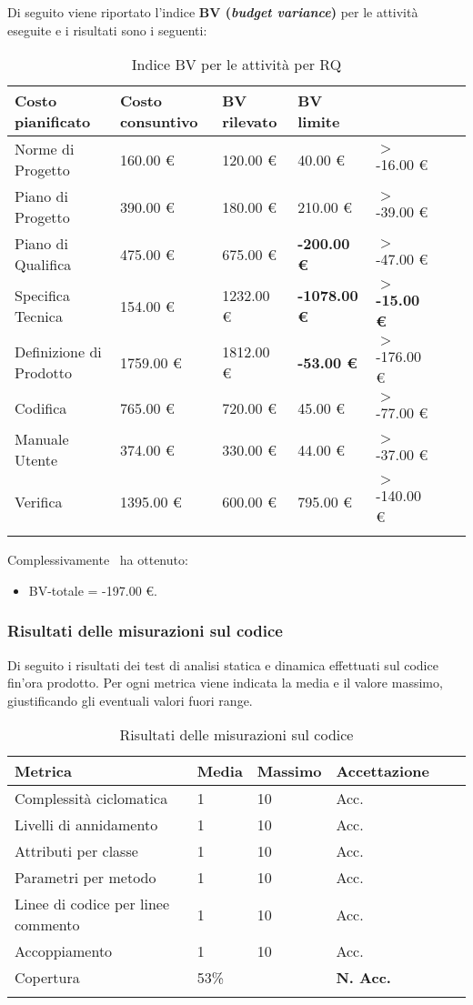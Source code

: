 Di seguito viene riportato l'indice \textbf{BV (\textit{budget variance})} per le attività eseguite e i risultati sono i seguenti:
\begin{longtable}{lllllXr}
\toprule
\textbf{Costo pianificato} & \textbf{Costo consuntivo} & \textbf{BV rilevato} & \textbf{BV limite} \\
\toprule
Norme di Progetto & 160.00 € & 120.00 € & 40.00 € & $>$ -16.00 €\\
\midrule
Piano di Progetto & 390.00 € & 180.00 € & 210.00 € & $>$ -39.00 €\\
\midrule
Piano di Qualifica & 475.00 € & 675.00 € & \textbf{-200.00 €} & $>$ -47.00 €\\
\midrule
Specifica Tecnica & 154.00 € & 1232.00 € & \textbf{-1078.00 €} & \textbf{$>$ -15.00 €}\\
\midrule
Definizione di Prodotto & 1759.00 € & 1812.00 € & \textbf{-53.00 €} & $>$ -176.00 €\\
\midrule
Codifica & 765.00 € & 720.00 € & 45.00 € & $>$ -77.00 €\\
\midrule
Manuale Utente & 374.00 € & 330.00 € & 44.00 € & $>$ -37.00 €\\
\midrule
Verifica & 1395.00 € & 600.00 € & 795.00 € & $>$ -140.00 €\\
\bottomrule
\caption{Indice BV per le attività per RQ}
\end{longtable}
Complessivamente \gruppo ~ha ottenuto:
\begin{itemize}
\item BV-totale = -197.00 €.
\end{itemize}
\subsubsection{Risultati delle misurazioni sul codice}
Di seguito i risultati dei test di analisi statica e dinamica effettuati sul codice fin'ora prodotto. Per ogni metrica viene indicata la media e il valore massimo, giustificando gli eventuali valori fuori range.\\
\begin{longtable}{llllXr}
\toprule
\textbf{Metrica} & \textbf{Media} & \textbf{Massimo} & \textbf{Accettazione}\\
\toprule
Complessità ciclomatica & 1 & 10 & Acc.\\%
\midrule
Livelli di annidamento & 1 & 10 & Acc.\\%
\midrule
Attributi per classe & 1 & 10 & Acc.\\%
\midrule
Parametri per metodo & 1 & 10 & Acc.\\%
\midrule
Linee di codice per linee commento & 1 & 10 & Acc.\\%
\midrule
Accoppiamento & 1 & 10 & Acc.\\%
\midrule
Copertura & 53\% &  & \textbf{N. Acc.}\\%
\bottomrule
\caption{Risultati delle misurazioni sul codice}
\end{longtable}